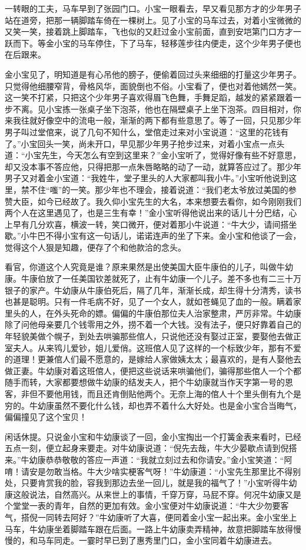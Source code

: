 \documentclass[12pt,UTF8]{ctexbook}
\begin{document}
{{{一转眼的工夫，马车早到了张园门口。小宝一眼看去，早又看见那方才的少年男子站在道旁，把那一辆脚踏车倚在一棵树上。见了小宝的马车过去，对着小宝微微的又笑一笑，接着跳上脚踏车，飞也似的又赶过金小宝前面，直到安垲第门口方才一跃而下。等金小宝的马车停住，下了马车，轻移莲步往内便走，这个少年男子便也在后跟来。

金小宝见了，明知道是有心吊他的膀子，便偷着回过头来细细的打量这少年男子。只觉得他细腰窄背，骨格风华，面貌倒也不俗。小宝看了，便也对着他嫣然一笑。这一笑不打紧，只把这个少年男子喜欢得眉飞色舞，手舞足蹈，越发的紧紧跟着一步不离。见小宝拣一张桌子坐下泡茶，他也在隔壁桌子上坐下泡茶。四目相对，你来我往就好像空中的流电一般，渐渐的两下都有些意思了。等了一回，只见那少年男子叫过堂倌来，说了几句不知什么，堂倌走过来对小宝说道：“这里的花钱有了。”小宝回头一笑，尚未开口，早见那少年男子抢步过来，对着小宝点一点头道：“小宝先生，今天怎么有空到这里来？”金小宝听了，觉得好像有些不好意思，却又没本事不答应他，只得把那一点朱唇略略的动了一动，就算答应过了。那少年男子又对着金小宝道：“我姓牛，堂子里头的人大家都叫我小牛。”小宝听他说到这里，禁不住“嗤”的一笑。那少年也不理会，接着说道：“我们老太爷放过美国的参赞大臣，如今已经故了。我久仰小宝先生的大名，本来想要去看你，如今刚刚我们两个人在这里遇见了，也是三生有幸！”金小宝听得他说出来的话儿十分巴结，心上早有几分欢喜，横波一转，笑口微开，便对着那小牛说道：“牛大少，请间搭坐歇。”小牛巴不得小宝有这一句话儿，诺诺连声的坐了下来。金小宝和他谈了一会，觉得这个人狠是知趣，便存了个和他款洽的念头。

看官，你道这个人究竟是谁？原来果然是出使美国大臣牛康伯的儿子，叫做牛幼康。牛康伯放了一任美国钦差就死了，止有牛幼康一个儿子。差不多也有二三十万银子的家产。牛幼康从牛康伯死后，隔了几年，渐渐长成，却生得十分清秀，读书也甚是聪明。只有一件毛病不好，见了一个女人，就如苍蝇见了血的一般。瞒着家里头的人，在外头死命的嫖。偏偏的牛康伯那位夫人治家整肃，严厉非常。牛幼康除了问他母亲要几个钱零用之外，捞不着一个大钱。没有法子，便只好靠着自己的年轻貌美做个幌子，到处去哄骗那些倌人，只说他还没有娶过正室，要娶他去做正室夫人。从来鸨儿爱钞，姐儿爱俏。这班倌人见了这样的一个标致少年，那有不爱的道理！更兼倌人们最不愿意的，是嫁给人家做姨太太；最喜欢的，是有人娶他去做正妻。牛幼康对着这班倌人，便把这些说话来哄骗他们，骗得那些倌人一个个都随手而转，大家都要想做牛幼康的结发夫人，把个牛幼康就当作天字第一号的恩客，非但不要他用钱，而且还肯倒贴他两个。无奈上海的倌人十个里头倒有九个是穷的。牛幼康虽然不要化什么钱，却也弄不着什么大好处。也是金小宝合当晦气，偏偏撞见了这个宝贝！

闲话休提。只说金小宝和牛幼康谈了一回，金小宝掏出一个打簧金表来看时，已经五点一刻，便立起身来要走。对牛幼康说道：“倪先去哉，牛大少晏歇点请到倪搭来。”牛幼康恭恭敬敬的答应一声道：“我就立刻过去和你请安。”金小宝笑道：“阿唷！请安是勿敢当格。牛大少啥实梗客气呀！”牛幼康道：“小宝先生那里比不得别处，只要肯赏我的脸，容我到那边去坐一回儿，就是我的福气了！”小宝听得牛幼康这般说法，自然高兴。从来世上的事情，千穿万穿，马屁不穿。何况牛幼康又是个堂堂一表的青年，自然的更加有效。金小宝便对牛幼康说道：“牛大少勿要客气，搭倪一同转去阿好？”牛幼康听了大喜，便同着金小宝一起出来。金小宝坐上马车，牛幼康坐着脚踏车跟在后面。一路上牛幼康卖弄精神，故意把脚踏车放得慢慢的，和马车同走。一霎时早已到了惠秀里门口，金小宝同着牛幼康进去。

}}}
\end{document}
